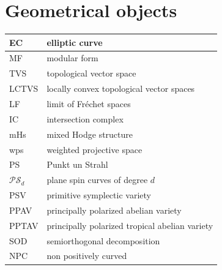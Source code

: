 \documentclass{amsart}
\numberwithin{equation}{section}
\theoremstyle{plain}
\numberwithin{equation}{section}
\theoremstyle{remark}
\begin{document}
\section{Geometrical objects}
\begin{longtable}{l|l}
\hline
EC & elliptic curve \\ \hline
MF & modular form  \\ \hline
TVS & topological vector space\\ \hline
LCTVS &  locally convex topological vector spaces\\ \hline
LF & limit of Fréchet spaces\\ \hline
IC & intersection complex\\ \hline
mHs & mixed Hodge structure\\ \hline
wps & weighted projective space\\ \hline
PS & Punkt un Strahl\\ \hline
$\mathcal{PS}_d$ & plane spin curves of degree $d$\\ \hline
PSV & primitive symplectic variety\\ \hline
PPAV & principally polarized abelian variety\\ \hline
PPTAV & principally polarized tropical abelian variety\\ \hline
SOD & semiorthogonal decomposition\\ \hline
NPC & non positively curved\\ \hline
\end{longtable}
\end{document}
